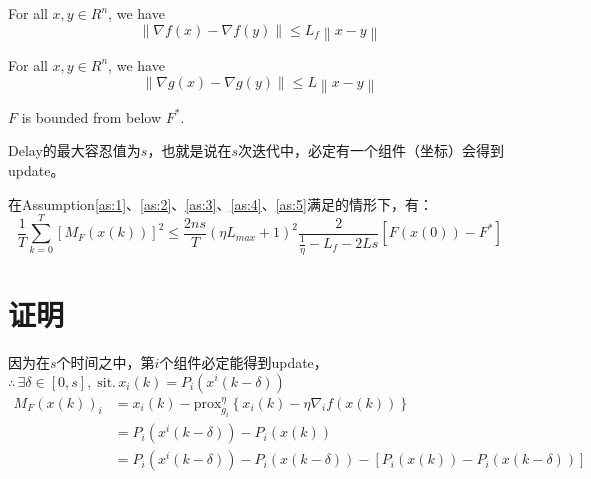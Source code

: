 \documentclass{ctexart}
\begin{document}
\begin{myas}\label{as:2}
For all $x,y \in R^n$, we have
    \begin{equation}\label{aseq:2}
      \left\| \nabla f\left(x\right) -\nabla f\left(y\right) \right\| \leq L_f \left\| x-y \right\|
    \end{equation}
\end{myas}

\begin{myas}\label{as:3}
For all $x,y \in R^n$, we have
    \begin{equation}\label{aseq:3}
      \left\| \nabla g\left(x\right) -\nabla g\left(y\right) \right\| \leq L \left\| x-y \right\|
    \end{equation}
\end{myas}

\begin{myas}\label{as:4}
    $F$ is bounded from below $F^*$.
\end{myas}

\begin{myas}\label{as:5}
    Delay的最大容忍值为$s$，也就是说在$s$次迭代中，必定有一个组件（坐标）会得到update。
\end{myas}

\begin{myth}\label{th:1}
    在Assumption\ref{as:1}、\ref{as:2}、\ref{as:3}、\ref{as:4}、\ref{as:5}满足的情形下，有：
    \begin{equation}\label{eq:7}
    \frac{1}{T}{\sum\limits_{k = 0}^T {\left[ {{M_F}\left( {x\left( k \right)} \right)} \right]} ^2} \leq \frac{2ns}{T}\left(\eta L_{max} + 1\right)^2 \frac{2}{\frac{1}{\eta}-L_f-2Ls} \left[F\left(x\left(0\right)\right) - F^* \right]
\end{equation}
\end{myth}

\newpage
\section{证明}

因为在$s$个时间之中，第$i$个组件必定能得到update，$\therefore \, \exists \delta\in \left[0,s\right],\; \text{sit.}\, x_i \left(k\right) = P_i \left(x^i \left(k-\delta \right)\right)$
\begin{align}\label{eq:8}
  M_F \left(x\left(k\right)\right)_i & = x_i \left(k\right) - \text{prox}_{g_i}^\eta \left\{x_i\left(k\right) - \eta \nabla_i f\left(x\left(k\right)\right)\right\} \nonumber\\
  & = P_i \left(x^i \left(k-\delta\right)\right) - P_i \left(x\left(k\right)\right) \nonumber \\
  & = P_i \left(x^i \left(k-\delta\right)\right) - P_i \left(x\left(k-\delta\right)\right) - \left[P_i \left(x\left(k\right)\right) - P_i \left(x\left(k-\delta\right)\right) \right]
\end{align}
\end{document}
